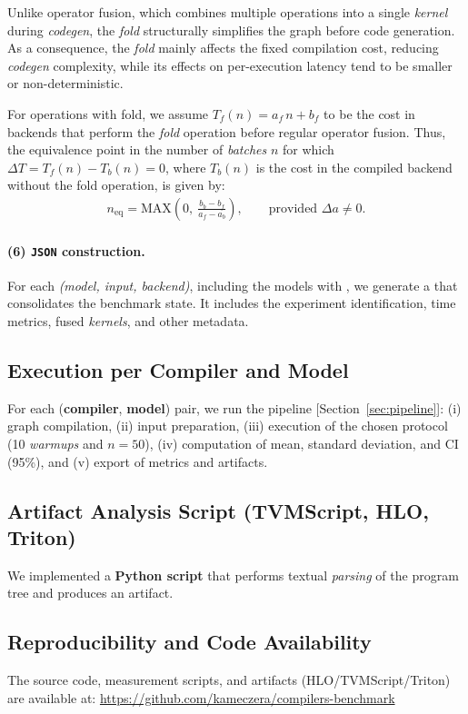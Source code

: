 \documentclass[sigconf,anonymous]{acmart}
\newcommand{\tcode}[1]{\texttt{\seqsplit{#1}}}
\begin{document}
Unlike operator fusion, which combines multiple operations into a single \textit{kernel} during \textit{codegen}, the \textit{fold} structurally simplifies the graph before code generation. As a consequence, the \textit{fold} mainly affects the fixed compilation cost, reducing \textit{codegen} complexity, while its effects on per-execution latency tend to be smaller or non-deterministic.

For operations with fold, we assume $T_f(n) = a_f \, n + b_f$ to be the cost in backends that perform the \textit{fold} operation before regular operator fusion. Thus, the equivalence point in the number of \textit{batches} $n$ for which $\Delta T = T_f(n) - T_b(n) = 0$, where $T_b(n)$ is the cost in the compiled backend without the fold operation, is given by:
\begin{align*}
n_{\text{eq}}
  = \mathrm{MAX}\!\left(0,\ \frac{b_b - b_f}{a_f - a_b}\right),
   \qquad \text{provided } \Delta a \neq 0.
\end{align*}

\paragraph{(6) \texttt{JSON} construction.}
For each \textit{(model, input, backend)}, including the models with \tcode{fold}, we generate a \tcode{JSON} that consolidates the benchmark state. It includes the experiment identification, time metrics, fused \textit{kernels}, and other metadata.

\subsection{Execution per Compiler and Model}
For each (\textbf{compiler}, \textbf{model}) pair, we run the pipeline [Section~\ref{sec:pipeline}]: (i) graph compilation, (ii) input preparation, (iii) execution of the chosen protocol (10 \emph{warmups} and $n = 50$), (iv) computation of mean, standard deviation, and CI (95\%), and (v) export of metrics and artifacts.

\subsection{Artifact Analysis Script (TVMScript, HLO, Triton)}
We implemented a \textbf{Python script} that performs textual \emph{parsing} of the program tree and produces an artifact.

\subsection*{Reproducibility and Code Availability}
The source code, measurement scripts, and artifacts (HLO/TVMScript/Triton) are available at:
\url{https://github.com/kameczera/compilers-benchmark}
\end{document}
